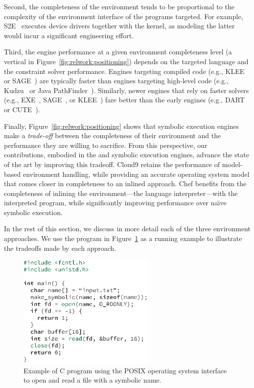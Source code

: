 Second, the completeness of the environment tends to be proportional to the complexity of the environment interface of the programs targeted.
%
For example, S2E~\cite{s2eSystem} executes device drivers together with the kernel, as modeling the latter would incur a significant engineering effort.

Third, the engine performance at a given environment completeness level (a vertical in Figure~\ref{fig:relwork:positioning}) depends on the targeted language and the constraint solver performance.
%
Engines targeting compiled code (e.g., KLEE~\cite{klee} or SAGE~\cite{godefroid:fuzz}) are typically faster than engines targeting high-level code (e.g., Kudzu~\cite{saxena-kudzu} or Java PathFinder~\cite{jpf-symbex}).
%
Similarly, newer engines that rely on faster solvers (e.g., EXE~\cite{exe}, SAGE~\cite{godefroid:fuzz}, or KLEE~\cite{klee}) fare better than the early engines (e.g., DART~\cite{dart} or CUTE~\cite{cute}).

Finally, Figure~\ref{fig:relwork:positioning} shows that symbolic execution engines make a \emph{trade-off} between the completeness of their environment and the performance they are willing to sacrifice.
%
From this perspective, our contributions, embodied in the \chef and \cnine symbolic execution engines, advance the state of the art by improving this tradeoff.
%
Cloud9 retains the performance of model-based environment handling, while providing an accurate operating system model that comes closer in completeness to an inlined approach.
%
Chef benefits from the completeness of inlining the environment---the language interpreter---with the interpreted program, while significantly improving performance over na\"{\i}ve symbolic execution.

In the rest of this section, we discuss in more detail each of the three environment approaches.
%
We use the program in Figure~\ref{fig:relwork:example} as a running example to illustrate the tradeoffs made by each approach.

\begin{figure}
  \centering
  \includegraphics[width=0.6\textwidth]{relatedwork/figures/environment-example}
  \caption{Example of C program using the POSIX operating system interface to open and read a file with a symbolic name.}
  \label{fig:relwork:example}
\end{figure}

